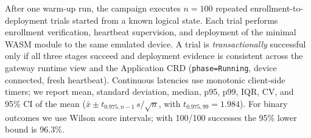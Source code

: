 {\color{red}After one warm-up run, the campaign executes $n{=}100$ repeated enrollment-to-deployment trials started from a known logical state.} Each trial performs enrollment verification, heartbeat supervision, and deployment of the minimal WASM module to the same emulated device. A trial is \emph{transactionally} successful only if all three stages succeed and deployment evidence is consistent across the gateway runtime view and the Application CRD (\texttt{phase=Running}, device connected, fresh heartbeat). Continuous latencies use monotonic client-side timers; we report mean, standard deviation, median, p95, p99, IQR, CV, and 95\% CI of the mean ($\bar{x} \pm t_{0.975,n-1}\,s/\sqrt{n}$, with $t_{0.975,99}{=}1.984$). For binary outcomes we use Wilson score intervals; with 100/100 successes the 95\% lower bound is 96.3\%.


